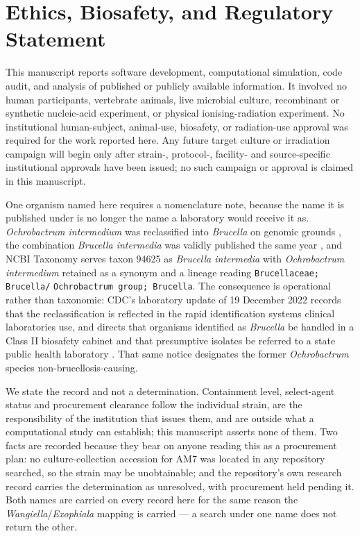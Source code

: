 \documentclass[11pt]{article}
\begin{document}
\section*{Ethics, Biosafety, and Regulatory Statement}
This manuscript reports software development, computational simulation, code audit, and analysis of
published or publicly available information. It involved no human participants, vertebrate animals,
live microbial culture, recombinant or synthetic nucleic-acid experiment, or physical
ionising-radiation experiment. No institutional human-subject, animal-use, biosafety, or radiation-use approval was required
for the work reported here. Any future target culture or
irradiation campaign will begin only after strain-, protocol-, facility- and source-specific
institutional approvals have been issued; no such campaign or approval is claimed in this
manuscript.

One organism named here requires a nomenclature note, because the name it is published under is
no longer the name a laboratory would receive it as. \textit{Ochrobactrum intermedium} was
reclassified into \textit{Brucella} on genomic grounds \cite{hordt2020}, the combination
\textit{Brucella intermedia} was validly published the same year \cite{oren2020}, and NCBI
Taxonomy serves taxon 94625 as \textit{Brucella intermedia} with \textit{Ochrobactrum
intermedium} retained as a synonym and a lineage reading \texttt{Brucellaceae; Brucella/}
\texttt{Ochrobactrum group; Brucella}. The consequence is operational rather than taxonomic: CDC's
laboratory update of 19 December 2022 records that the reclassification is reflected in the rapid
identification systems clinical laboratories use, and directs that organisms identified as
\textit{Brucella} be handled in a Class II biosafety cabinet and that presumptive isolates be
referred to a state public health laboratory \cite{cdc2022}. That same notice designates the
former \textit{Ochrobactrum} species non-brucellosis-causing.

We state the record and not a determination. Containment level, select-agent status and
procurement clearance follow the individual strain, are the responsibility of the institution
that issues them, and are outside what a computational study can establish; this manuscript
asserts none of them. Two facts are recorded because they bear on anyone reading this as a
procurement plan: no culture-collection accession for AM7 was located in any repository searched,
so the strain may be unobtainable; and the repository's own research record carries the
determination as unresolved, with procurement held pending it. Both names are carried on every
record here for the same reason the \textit{Wangiella}/\textit{Exophiala} mapping is carried
--- a search under one name does not return the other.
\end{document}
